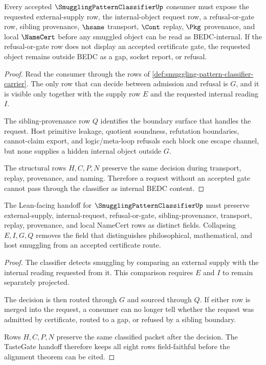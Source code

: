 \begin{theorem}
\label{thm:smuggling-pattern-classifier-nonescape}
Every accepted $\SmugglingPatternClassifierUp$ consumer must expose the requested external-supply row, the internal-object request row, a refusal-or-gate row, sibling provenance, $\hsame$ transport, $\Cont$ replay, $\Pkg$ provenance, and local $\NameCert$ before any smuggled object can be read as BEDC-internal. If the refusal-or-gate row does not display an accepted certificate gate, the requested object remains outside BEDC as a gap, socket report, or refusal.
\end{theorem}
\begin{proof}
Read the consumer through the rows of \autoref{def:smuggling-pattern-classifier-carrier}. The only row that can decide between admission and refusal is $G$, and it is visible only together with the supply row $E$ and the requested internal reading $I$.

The sibling-provenance row $Q$ identifies the boundary surface that handles the request. Host primitive leakage, quotient soundness, refutation boundaries, cannot-claim export, and logic/meta-loop refusals each block one escape channel, but none supplies a hidden internal object outside $G$.

The structural rows $H,C,P,N$ preserve the same decision during transport, replay, provenance, and naming. Therefore a request without an accepted gate cannot pass through the classifier as internal BEDC content.
\end{proof}

\begin{theorem}
\label{thm:smuggling-pattern-classifier-tastegate-handoff}
The Lean-facing handoff for $\SmugglingPatternClassifierUp$ must preserve external-supply, internal-request, refusal-or-gate, sibling-provenance, transport, replay, provenance, and local NameCert rows as distinct fields. Collapsing $E,I,G,Q$ removes the field that distinguishes philosophical, mathematical, and host smuggling from an accepted certificate route.
\end{theorem}
\begin{proof}
The classifier detects smuggling by comparing an external supply with the internal reading requested from it. This comparison requires $E$ and $I$ to remain separately projected.

The decision is then routed through $G$ and sourced through $Q$. If either row is merged into the request, a consumer can no longer tell whether the request was admitted by certificate, routed to a gap, or refused by a sibling boundary.

Rows $H,C,P,N$ preserve the same classified packet after the decision. The TasteGate handoff therefore keeps all eight rows field-faithful before the alignment theorem can be cited.
\end{proof}

